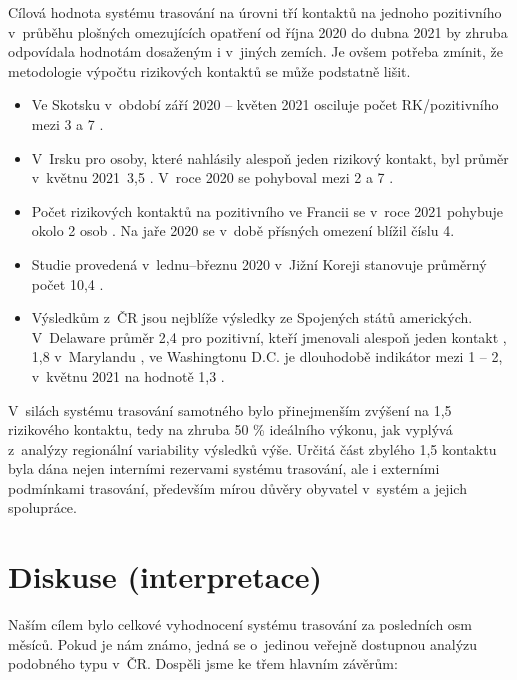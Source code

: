 Cílová hodnota systému trasování na úrovni tří kontaktů na jednoho pozitivního v~průběhu plošných omezujících opatření od října 2020 do dubna 2021 by zhruba odpovídala hodnotám dosaženým i v~jiných zemích. Je ovšem potřeba zmínit, že metodologie výpočtu rizikových kontaktů se může podstatně lišit. 
\begin{itemize}
\item Ve Skotsku v~období září 2020 -- květen 2021 osciluje počet RK/pozitivního mezi 3 a 7 \cite{tr_scotland01}.
\item V~Irsku pro osoby, které nahlásily alespoň jeden rizikový kontakt, byl průměr v~květnu 2021~3,5 \cite{tr_irland}. V~roce 2020 se pohyboval mezi 2 a 7 \cite{tr_mcaloon_numbers_2021}.
\item Počet rizikových kontaktů na pozitivního ve Francii se v~roce 2021 pohybuje okolo 2 osob \cite{tr_france}. Na jaře 2020 se v~době přísných omezení blížil číslu 4.
\item Studie provedená v~lednu--březnu 2020 v~Jižní Koreji stanovuje průměrný počet 10,4 \cite{tr_park}.
\item Výsledkům z~ČR jsou nejblíže výsledky ze Spojených států amerických. V~Delaware průměr 2,4 pro pozitivní, kteří jmenovali alespoň jeden kontakt \cite{tr_Delaware}, 1,8 v~Marylandu \cite{tr_maryland01}, ve Washingtonu D.C. je dlouhodobě indikátor mezi 1 -- 2, v~květnu 2021 na hodnotě 1,3 \cite{tr_DC}.
\end{itemize}

V~silách systému trasování samotného bylo přinejmenším zvýšení na 1,5 rizikového kontaktu, tedy na zhruba 50 \% ideálního výkonu, jak vyplývá z~analýzy regionální variability výsledků výše. Určitá část zbylého 1,5 kontaktu byla dána nejen interními rezervami systému trasování, ale i externími podmínkami trasování, především mírou důvěry obyvatel v~systém a jejich spolupráce.

\section*{Diskuse (interpretace)}

Naším cílem bylo celkové vyhodnocení systému trasování za posledních osm měsíců. Pokud je nám známo, jedná se o~jedinou veřejně dostupnou analýzu podobného typu v~ČR. Dospěli jsme ke třem hlavním závěrům:


